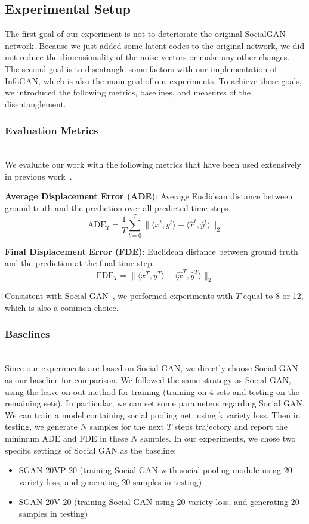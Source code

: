 \subsection{Experimental Setup}
The first goal of our experiment is not to deteriorate the original SocialGAN network. Because we just added some latent codes to the original network, we did not reduce the dimensionality of the noise vectors or make any other changes. The second goal is to disentangle some factors with our implementation of InfoGAN, which is also the main goal of our experiments. To achieve these goals, we introduced the following metrics, baselines, and measures of the disentanglement.


\subsubsection{Evaluation Metrics}
\hfill \\
We evaluate our work with the following metrics that have been used extensively in previous work~\cite{Gupta_2018_CVPR, distant_prediction, Alahi16}.

\textbf{Average Displacement Error (ADE)}:  Average Euclidean distance between ground truth and the prediction over all predicted time steps.
$$\text{ADE}_{T} = \frac 1 T \sum_{t=0}^{T} \lVert \langle x^t, y^t \rangle - \langle \hat x^t, \hat y^t \rangle \lVert_{2} $$


\textbf{Final Displacement Error (FDE)}: Euclidean distance between ground truth and the prediction at the final time step.
$$\text{FDE}_{T} = \lVert \langle x^T, y^T \rangle - \langle \hat x^T, \hat y^T \rangle \lVert_{2}  $$

Consistent with Social GAN~\cite{Gupta_2018_CVPR}, we performed experiments with $T$ equal to 8 or 12, which is also a common choice.


\subsubsection{Baselines}
\hfill \\
Since our experiments are based on Social GAN, we directly choose Social GAN as our baseline for comparison. We followed the same strategy as Social GAN, using the leave-on-out method for training (training on 4 sets and testing on the remaining sets). In particular,  we can set some parameters regarding Social GAN. We can train a model containing social pooling net, using k variety loss. Then in testing, we generate $N$ samples for the next $T$ steps trajectory and report the minimum ADE and FDE in these $N$ samples. In our experiments, we chose two specific settings of Social GAN as the baseline:
\begin{itemize}
  \item SGAN-20VP-20 (training Social GAN with social pooling module using 20 variety loss, and generating 20 samples in testing)
  \item SGAN-20V-20 (training Social GAN using 20 variety loss, and generating 20 samples in testing)
\end{itemize}

